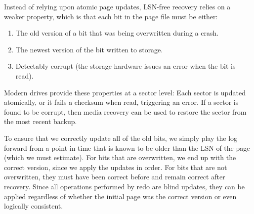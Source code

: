 \documentclass[letterpaper,twocolumn,10pt]{article}
\newcommand{\eat}[1]{}
\begin{document}
Instead of relying upon atomic page updates, LSN-free recovery relies
on a weaker property, which is that each bit in the page file must
be either:
\begin{enumerate}
\item The old version of a bit that was being overwritten during a crash.
\item The newest version of the bit written to storage.
\item Detectably corrupt (the storage hardware issues an error when the
  bit is read).
\end{enumerate}

Modern drives provide these properties at a sector level: Each sector
is updated atomically, or it fails a checksum when read, triggering an
error.  If a sector is found to be corrupt, then media recovery can be
used to restore the sector from the most recent backup.

To ensure that we correctly update all of the old bits, we simply
play the log forward from a point in time that is known to be older than the
LSN of the page (which we must estimate).  For bits that are
overwritten, we end up with the correct version, since we apply the
updates in order.  For bits that are not overwritten, they must have
been correct before and remain correct after recovery.  Since all
operations performed by redo are blind updates, they can be applied
regardless of whether the initial page was the correct version or even
logically consistent.


\eat{ Figure~\ref{fig:todo} provides an example page, and a number of
log entries that were applied to it.  Assume that the initial version
of the page, with LSN $0$, is on disk, and the disk is in the process
of writing out the version with LSN $2$ when the system crashes.  When
recovery reads the page from disk, it may encounter any combination of
sectors from these two versions.

Note that the first and last two sectors are not overwritten by any
of the log entries that Redo will play back.  Therefore, their value
is unchanged in both versions of the page.  Since Redo will not change
them, we know that they will have the correct value when it completes.
The remainder of the sectors are overwritten at some point in the log.
If we constrain the updates to overwrite an entire sector at once, then
the initial on-disk value of these sectors would not have any affect
on the outcome of Redo.  Furthermore, since the redo entries are
played back in order, each sector would contain the most up to date
version after redo.

Of course, we do not want to constrain log entries to update entire
sectors at once.  In order to support finer-grained logging, we simply
repeat the above argument on the byte or bit level.  Each bit is
either overwritten by redo, or has a known, correct, value before
redo.
}
\end{document}
